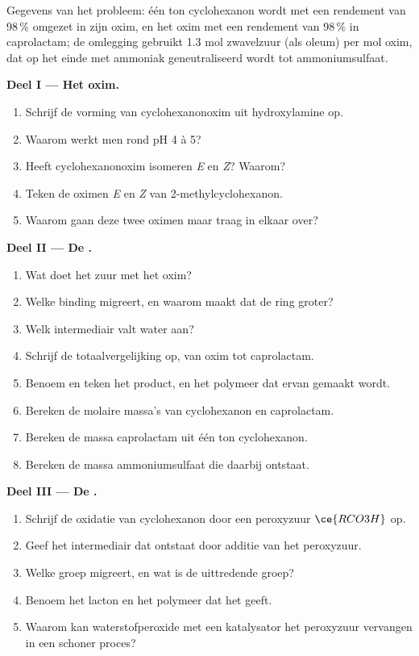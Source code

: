 \begin{problem}
\label{pb:b3:radicals-carbenes:1}
Gegevens van het probleem: één ton cyclohexanon wordt met een rendement
van 98\,\% omgezet in zijn oxim, en het oxim met een rendement van
98\,\% in caprolactam; de omlegging gebruikt
1.3 mol zwavelzuur (als oleum) per mol oxim, dat op het einde met
ammoniak geneutraliseerd wordt tot ammoniumsulfaat.

\medskip\noindent\textbf{Deel I --- Het oxim.}
\begin{enumerate}
  \item Schrijf de vorming van cyclohexanonoxim uit hydroxylamine op.
  \item Waarom werkt men rond pH 4 à 5?
  \item Heeft cyclohexanonoxim isomeren \textit{E} en \textit{Z}? Waarom?
  \item Teken de oximen \textit{E} en \textit{Z} van 2-methylcyclohexanon.
  \item Waarom gaan deze twee oximen maar traag in elkaar over?
\end{enumerate}

\medskip\noindent\textbf{Deel II --- De .}
\begin{enumerate}[resume]
  \item Wat doet het zuur met het oxim?
  \item Welke binding migreert, en waarom maakt dat de ring groter?
  \item Welk intermediair valt water aan?
  \item Schrijf de totaalvergelijking op, van oxim tot caprolactam.
  \item Benoem en teken het product, en het polymeer dat ervan gemaakt
        wordt.
  \item Bereken de molaire massa's van cyclohexanon en caprolactam.
  \item Bereken de massa caprolactam uit één ton cyclohexanon.
  \item Bereken de massa ammoniumsulfaat die daarbij ontstaat.
\end{enumerate}

\medskip\noindent\textbf{Deel III --- De .}
\begin{enumerate}[resume]
  \item Schrijf de oxidatie van cyclohexanon door een peroxyzuur $\ce{RCO3H}$ op.
  \item Geef het intermediair dat ontstaat door additie van het
        peroxyzuur.
  \item Welke groep migreert, en wat is de uittredende groep?
  \item Benoem het lacton en het polymeer dat het geeft.
  \item Waarom kan waterstofperoxide met een katalysator het peroxyzuur
        vervangen in een schoner proces?
\end{enumerate}


\end{problem}
